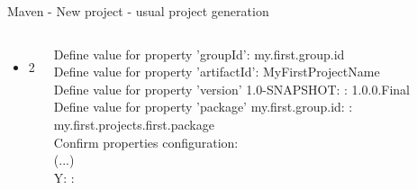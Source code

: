 \documentclass[aspectratio=1610,english]{beamer} %
\begin{document}
\begin{frame}{Maven - New project - usual project generation}
\begin{columns}
				\begin{itemize}
					\tiny
					\color{black}
					\item 2
				\end{itemize}
				\fontsize{4}{5} \selectfont
				Define value for property 'groupId': my.first.group.id \\
				Define value for property 'artifactId': MyFirstProjectName \\
				Define value for property 'version' 1.0-SNAPSHOT: : 1.0.0.Final \\
				Define value for property 'package' my.first.group.id: : 											my.first.projects.first.package \\
				Confirm properties configuration: \\
				(...) \\
				Y: : 
				

\end{columns}
\end{frame}
\end{document}
